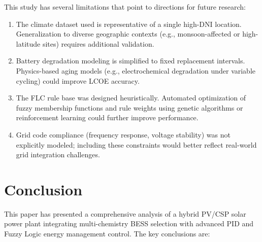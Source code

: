 \documentclass[journal]{IEEEtran}
\begin{document}
This study has several limitations that point to directions for future research:

\begin{enumerate}
    \item The climate dataset used is representative of a single high-DNI location. Generalization to diverse geographic contexts (e.g., monsoon-affected or high-latitude sites) requires additional validation.
    \item Battery degradation modeling is simplified to fixed replacement intervals. Physics-based aging models (e.g., electrochemical degradation under variable cycling) could improve LCOE accuracy.
    \item The FLC rule base was designed heuristically. Automated optimization of fuzzy membership functions and rule weights using genetic algorithms or reinforcement learning could further improve performance.
    \item Grid code compliance (frequency response, voltage stability) was not explicitly modeled; including these constraints would better reflect real-world grid integration challenges.
\end{enumerate}

\section{Conclusion}
\label{sec:conclusion}

This paper has presented a comprehensive analysis of a hybrid PV/CSP solar power plant integrating multi-chemistry BESS selection with advanced PID and Fuzzy Logic energy management control. The key conclusions are:
\end{document}
